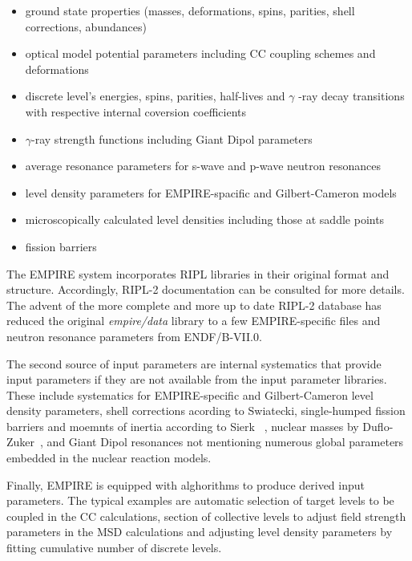 \begin{itemize}
\item ground state properties (masses, deformations, spins, parities, shell
corrections, abundances)

\item optical model potential parameters including CC coupling schemes and
deformations

\item discrete level's energies, spins, parities, half-lives and $\gamma$%
-ray decay transitions with respective internal coversion coefficients

\item $\gamma$-ray strength functions including Giant Dipol parameters

\item average resonance parameters for s-wave and p-wave neutron resonances

\item level density parameters for EMPIRE-spacific and Gilbert-Cameron models

\item microscopically calculated level densities including those at saddle
points

\item fission barriers
\end{itemize}

The EMPIRE system incorporates RIPL libraries in their original format and
structure. Accordingly, RIPL-2 documentation can be consulted for more
details. The advent of the more complete and more up to date RIPL-2 database
has reduced the original \emph{empire/data} library to a few EMPIRE-specific
files and neutron resonance parameters from ENDF/B-VII.0.

The second source of input parameters are internal systematics that provide
input parameters if they are not available from the input parameter
libraries. These include systematics for EMPIRE-specific and Gilbert-Cameron
level density parameters, shell corrections acording to Swiatecki,
single-humped fission barriers and moemnts of inertia according to Sierk~%
\cite{sierk}, nuclear masses by Duflo-Zuker~\cite{Duflo:96}, and Giant Dipol
resonances not mentioning numerous global parameters embedded in the nuclear
reaction models.

Finally, EMPIRE is equipped with alghorithms to produce derived input
parameters. The typical examples are automatic selection of target levels to
be coupled in the CC calculations, section of collective levels to adjust
field strength parameters in the MSD calculations and adjusting level
density parameters by fitting cumulative number of discrete levels.


